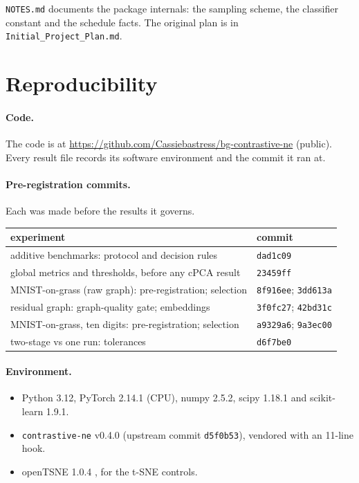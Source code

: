 \documentclass[10pt]{article}
\begin{document}
\texttt{NOTES.md} documents the package internals: the sampling scheme, the classifier constant and the schedule facts. The original plan is in \texttt{Initial\_Project\_Plan.md}.

\section{Reproducibility}
\label{app:repro}

\paragraph{Code.} The code is at \url{https://github.com/Cassiebastress/bg-contrastive-ne} (public). Every result file records its software environment and the commit it ran at.

\paragraph{Pre-registration commits.} Each was made before the results it governs.
\begin{center}
\small
\begin{tabular}{ll}
  \toprule
  experiment & commit \\
  \midrule
  additive benchmarks: protocol and decision rules & \texttt{dad1c09} \\
  global metrics and thresholds, before any cPCA result & \texttt{23459ff} \\
  MNIST-on-grass (raw graph): pre-registration; selection & \texttt{8f916ee}; \texttt{3dd613a} \\
  residual graph: graph-quality gate; embeddings & \texttt{3f0fc27}; \texttt{42bd31c} \\
  MNIST-on-grass, ten digits: pre-registration; selection & \texttt{a9329a6}; \texttt{9a3ec00} \\
  two-stage vs one run: tolerances & \texttt{d6f7be0} \\
  \bottomrule
\end{tabular}
\end{center}

\paragraph{Environment.}
\begin{itemize}
  \item Python 3.12, PyTorch 2.14.1 (CPU), numpy 2.5.2, scipy 1.18.1 and scikit-learn 1.9.1.
  \item \texttt{contrastive-ne} v0.4.0 (upstream commit \texttt{d5f0b53}), vendored with an 11-line hook.
  \item openTSNE 1.0.4 \cite{policar2024opentsne}, for the t-SNE controls.
\end{itemize}
\end{document}
